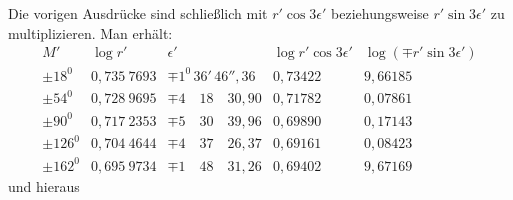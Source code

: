 Die vorigen Ausdrücke sind schließlich mit \(r'\cos3\epsilon'\) beziehungsweise \(r'\sin3\epsilon'\) zu multiplizieren. Man erhält:
\begingroup\footnotesize\setlength{\arraycolsep}{4pt}
\[
\begin{array}{r|r|r|r|r}
M'&\log r'&\epsilon'&\log r'\cos3\epsilon'&\log(\mp r'\sin3\epsilon')\\\hline
\pm18^{0}&0{,}735\ 7693&\mp1^{0}\,36'\,46''{,}36&0{,}73422&9{,}66185\\
\pm54^{0}&0{,}728\ 9695&\mp4\quad18\quad30{,}90&0{,}71782&0{,}07861\\
\pm90^{0}&0{,}717\ 2353&\mp5\quad30\quad39{,}96&0{,}69890&0{,}17143\\
\pm126^{0}&0{,}704\ 4644&\mp4\quad37\quad26{,}37&0{,}69161&0{,}08423\\
\pm162^{0}&0{,}695\ 9734&\mp1\quad48\quad31{,}26&0{,}69402&9{,}67169
\end{array}
\]
\endgroup
und hieraus
